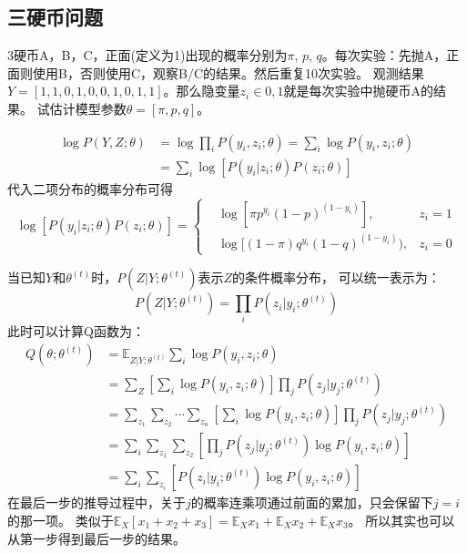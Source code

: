 \subsection{三硬币问题}
3硬币A，B，C，正面(定义为1)出现的概率分别为$\pi$, $p$, $q$。每次实验：先抛A，正面则使用B，否则使用C，观察B/C的结果。然后重复10次实验。
观测结果$Y=[1,1,0,1,0,0,1,0,1,1]$。那么隐变量$z_i \in {0, 1}$就是每次实验中抛硬币A的结果。
试估计模型参数$\theta = [\pi, p, q]$。

\begin{align*}
    \log P(Y,Z; \theta) &= \log \prod_i P(y_i, z_i; \theta) = \sum_i \log P(y_i, z_i; \theta) \\
    &= \sum_i \log [ P(y_i|z_i; \theta) P(z_i; \theta) ]
\end{align*}
代入二项分布的概率分布可得
\begin{equation*}
\log [ P(y_i|z_i; \theta) P(z_i; \theta) ] = \left\{
    \begin{aligned}
        & \log[\pi p^{y_i}(1-p)^{(1-y_i)}] , & z_i =1 \\
        & \log[(1-\pi)q^{y_i}(1-q)^{(1-y_i)}), & z_i =0
    \end{aligned}
    \right.
\end{equation*}

当已知$Y$和$\theta^{(t)}$时，$P(Z|Y; \theta^{(t)})$表示$Z$的条件概率分布，
可以统一表示为：
\begin{equation*}
    P(Z|Y; \theta^{(t)}) = \prod_i P(z_i|y_i; \theta^{(t)})
\end{equation*}
此时可以计算Q函数为：
\begin{align*}
    Q(\theta; \theta^{(t)}) &= \mathbb{E}_{Z|Y; \theta^{(t)}} \sum_i \log P(y_i,z_i;\theta) \\
    &= \sum_Z \left[ \sum_i \log P(y_i,z_i;\theta) \right] \prod_j P(z_j|y_j; \theta^{(t)}) \\
    &= \sum_{z_1} \sum_{z_2} \cdots \sum_{z_n} \left[ \sum_i \log P(y_i,z_i;\theta) \right] \prod_j P(z_j|y_j; \theta^{(t)}) \\
    &= \sum_i \sum_{z_1} \sum_{z_2} \left[ \prod_j P(z_j|y_j; \theta^{(t)}) \log P(y_i,z_i;\theta) \right] \\
    &= \sum_i \sum_{z_i} \left[P(z_i|y_i; \theta^{(t)}) \log P(y_i,z_i;\theta) \right]
\end{align*}
在最后一步的推导过程中，关于$j$的概率连乘项通过前面的累加，只会保留下$j=i$的那一项。
类似于$\mathbb{E}_{X}[x_1+x_2+x_3] = \mathbb{E}_{X} x_1 + \mathbb{E}_{X} x_2 + \mathbb{E}_{X} x_3$。
所以其实也可以从第一步得到最后一步的结果。

